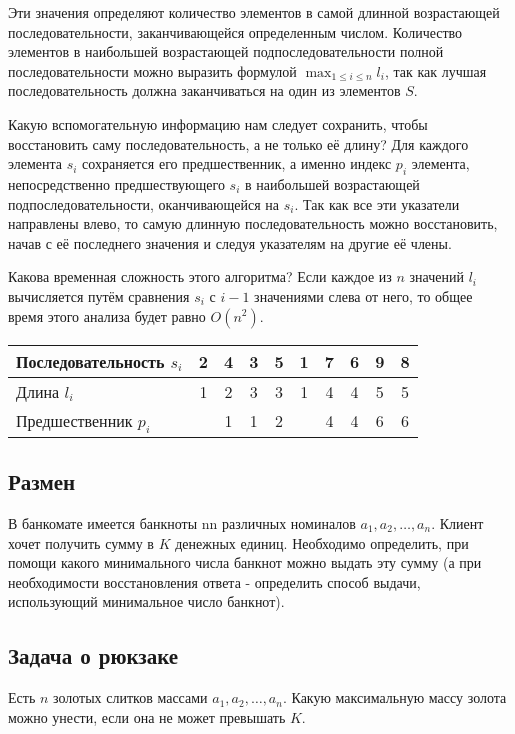 \documentclass[14pt]{book}
\begin{document}
Эти значения определяют количество элементов в самой длинной возрастающей последовательности,
заканчивающейся определенным числом. Количество элементов в наибольшей возрастающей
подпоследовательности полной последовательности можно выразить формулой $\max_{1\le i\le n}l_i$,
так как лучшая последовательность должна заканчиваться на один из элементов $S$.

Какую вспомогательную информацию нам следует сохранить, чтобы восстановить саму
последовательность, а не только её длину? Для каждого элемента $s_i$ сохраняется его
предшественник, а именно индекс $p_i$ элемента, непосредственно предшествующего $s_i$
в наибольшей возрастающей подпоследовательности, оканчивающейся на $s_i$. Так как все
эти указатели направлены влево, то самую длинную последовательность можно восстановить,
начав с её последнего значения и следуя указателям на другие её члены.

Какова временная сложность этого алгоритма? Если каждое из $n$ значений $l_i$ вычисляется
путём сравнения $s_i$ с $i-1$ значениями слева от него, то общее время этого анализа
будет равно $O(n^2)$.

\begin{tabular}{l|c|c|c|c|c|c|c|c|c}
Последовательность $s_i$ & 2 & 4 & 3 & 5 & 1 & 7 & 6 & 9 & 8 \\
\hline
Длина $l_i$              & 1 & 2 & 3 & 3 & 1 & 4 & 4 & 5 & 5 \\
\hline
Предшественник $p_i$     &   & 1 & 1 & 2 &   & 4 & 4 & 6 & 6 \\
\end{tabular}

\subsection{Размен}

В банкомате имеется банкноты nn различных номиналов $a_1, a_2, \ldots, a_n$. Клиент хочет получить сумму в $K$ денежных единиц. Необходимо определить, при помощи какого минимального числа банкнот можно выдать эту сумму (а при необходимости восстановления ответа - определить способ выдачи, использующий минимальное число банкнот).

\subsection{Задача о рюкзаке}

Есть $n$ золотых слитков массами $a_1, a_2, \ldots, a_n$. Какую максимальную массу золота можно унести, если она не может превышать $K$.
\end{document}
